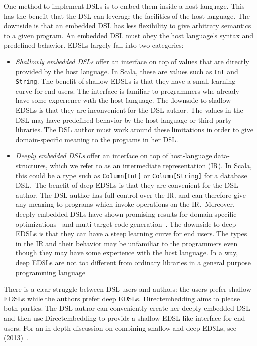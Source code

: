 \documentclass[11pt,a4paper]{article}
\begin{document}
One method to implement DSLs is to embed them inside a host language.
This has the benefit that the DSL can leverage the facilities of the host language.
The downside is that an embedded DSL has less flexibility to give arbitrary semantics to a given program.
An embedded DSL must obey the host language's syntax and predefined behavior.
EDSLs largely fall into two categories:
\begin{itemize}
    \item \emph{Shallowly embedded DSLs} offer an interface on top of values that are directly provided by the host language.
        In Scala, these are values such as \texttt{Int} and \texttt{String}.
        The benefit of shallow EDSLs is that they have a small learning curve for end users.
        The interface is familiar to programmers who already have some experience with the host language.
        The downside to shallow EDSLs is that they are inconvenient for the DSL author.
        The values in the DSL may have predefined behavior by the host language or third-party libraries.
        The DSL author must work around these limitations in order to give domain-specific meaning to the programs in her DSL.

    \item \emph{Deeply embedded DSLs} offer an interface on top of host-language data-structures, which we refer to as an intermediate representation (IR).
        In Scala, this could be a type such as \texttt{Column[Int]} or \texttt{Column[String]} for a database DSL.\
        The benefit of deep EDSLs is that they are convenient for the DSL author.
        The DSL author has full control over the IR, and can therefore give any meaning to programs which invoke operations on the IR.\
        Moreover, deeply embedded DSLs have shown promising results for domain-specific optimizations~\autocite{rompf_optimizing_2013,rompf_lightweight_2012} and multi-target code generation~\autocite{brown_heterogeneous_2011}.
        The downside to deep EDSLs is that they can have a steep learning curve for end users.
        The types in the IR and their behavior may be unfamiliar to the programmers even though they may have some experience with the host language.
        In a way, deep EDSLs are not too different from ordinary libraries in a general purpose programming language.
\end{itemize}
There is a clear struggle between DSL users and authors: the users prefer shallow EDSLs while the authors prefer deep EDSLs.
Directembedding aims to please both parties.
The DSL author can conveniently create her deeply embedded DSL and then use Directembedding to provide a shallow EDSL-like interface for end users.
For an in-depth discussion on combining shallow and deep EDSLs, see~\citeauthor{svenningsson_combining_2013} (2013)~\autocite{svenningsson_combining_2013}.
\end{document}
